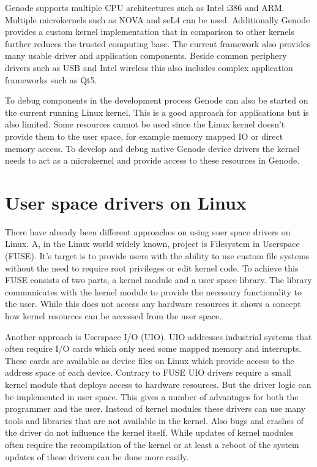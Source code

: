 \documentclass[
a4paper,
12pt,
notitlepage,
parskip=half,
DIV=11,
]{scrbook}
\begin{document}
		Genode supports multiple CPU architectures such as Intel i386 and ARM.
		Multiple microkernels such as NOVA and seL4 can be used.
		Additionally Genode provides a custom kernel implementation that in comparison to other kernels further reduces the trusted computing base.
		The current framework also provides many usable driver and application components.
		Beside common periphery drivers such as USB and Intel wireless this also includes complex application frameworks such as Qt5. \citep{genode}
		
		To debug components in the development process Genode can also be started on the current running Linux kernel.
		This is a good approach for applications but is also limited.
		Some resources cannot be used since the Linux kernel doesn't provide them to the user space, for example memory mapped IO or direct memory access.
		To develop and debug native Genode device drivers the kernel needs to act as a microkernel and provide access to these resources in Genode.
		
		\section{User space drivers on Linux}
		
		There have already been different approaches on using suer space drivers on Linux.
		A, in the Linux world widely known, project is Filesystem in Userspace (FUSE).
		It's target is to provide users with the ability to use custom file systems without the need to require root privileges or edit kernel code.
		To achieve this FUSE consists of two parts, a kernel module and a user space library.
		The library communicates with the kernel module to provide the necessary functionality to the user.
		While this does not access any hardware resources it shows a concept how kernel resources can be accessed from the user space. \citep{fuse}
		
		Another approach is Userspace I/O (UIO).
		UIO addresses industrial systems that often require I/O cards which only need some mapped memory and interrupts.
		These cards are available as device files on Linux which provide access to the address space of each device.
		Contrary to FUSE UIO drivers require a small kernel module that deploys access to hardware resources.
		But the driver logic can be implemented in user space.
		This gives a number of advantages for both the programmer and the user.
		Instead of kernel modules these drivers can use many tools and libraries that are not available in the kernel.
		Also bugs and crashes of the driver do not influence the kernel itself.
		While updates of kernel modules often require the recompilation of the kernel or at least a reboot of the system updates of these drivers can be done more easily. \citep{uio}
		
\end{document}
